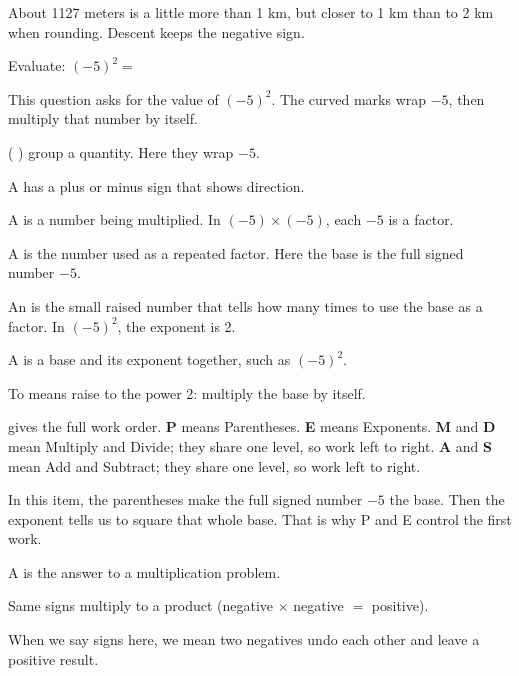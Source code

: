 
\noindent About 1127 meters is a little more than 1 km, but closer to 1 km than to 2 km when rounding. Descent keeps the negative sign.


\noindent Evaluate: $(-5)^{2} =$


\noindent This question asks for the value of $(-5)^{2}$. The curved marks wrap $-5$, then multiply that number by itself.

\begin{words}
  \item {}( ) group a quantity. Here they wrap $-5$.
  \item A has a plus or minus sign that shows direction.
  \item A is a number being multiplied. In $(-5) \times (-5)$, each $-5$ is a factor.
  \item A is the number used as a repeated factor. Here the base is the full signed number $-5$.
  \item An is the small raised number that tells how many times to use the base as a factor. In $(-5)^{2}$, the exponent is 2.
  \item A is a base and its exponent together, such as $(-5)^{2}$.
  \item To means raise to the power 2: multiply the base by itself.
  \item {}gives the full work order. \textbf{P} means Parentheses. \textbf{E} means Exponents. \textbf{M} and \textbf{D} mean Multiply and Divide; they share one level, so work left to right. \textbf{A} and \textbf{S} mean Add and Subtract; they share one level, so work left to right.
  \item In this item, the parentheses make the full signed number $-5$ the base. Then the exponent tells us to square that whole base. That is why P and E control the first work.
  \item A is the answer to a multiplication problem.
  \item Same signs multiply to a product (negative $\times$ negative $=$ positive).
  \item When we say signs here, we mean two negatives undo each other and leave a positive result.
\end{words}

